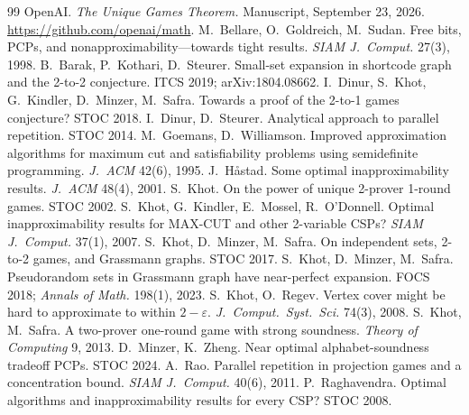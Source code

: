 \documentclass[11pt]{article}
\theoremstyle{definition}
\theoremstyle{remark}
\newcommand{\eps}{\varepsilon}
\begin{document}

\begin{thebibliography}{99}\small
{} OpenAI. \emph{The Unique Games Theorem.} Manuscript, September 23, 2026. \url{https://github.com/openai/math}.
 M.~Bellare, O.~Goldreich, M.~Sudan. Free bits, PCPs, and nonapproximability---towards tight results. \emph{SIAM J.\ Comput.} 27(3), 1998.
 B.~Barak, P.~Kothari, D.~Steurer. Small-set expansion in shortcode graph and the 2-to-2 conjecture. ITCS 2019; arXiv:1804.08662.
 I.~Dinur, S.~Khot, G.~Kindler, D.~Minzer, M.~Safra. Towards a proof of the 2-to-1 games conjecture? STOC 2018.
 I.~Dinur, D.~Steurer. Analytical approach to parallel repetition. STOC 2014.
 M.~Goemans, D.~Williamson. Improved approximation algorithms for maximum cut and satisfiability problems using semidefinite programming. \emph{J.\ ACM} 42(6), 1995.
 J.~H{\aa}stad. Some optimal inapproximability results. \emph{J.\ ACM} 48(4), 2001.
 S.~Khot. On the power of unique 2-prover 1-round games. STOC 2002.
 S.~Khot, G.~Kindler, E.~Mossel, R.~O'Donnell. Optimal inapproximability results for MAX-CUT and other 2-variable CSPs? \emph{SIAM J.\ Comput.} 37(1), 2007.
 S.~Khot, D.~Minzer, M.~Safra. On independent sets, 2-to-2 games, and Grassmann graphs. STOC 2017.
 S.~Khot, D.~Minzer, M.~Safra. Pseudorandom sets in Grassmann graph have near-perfect expansion. FOCS 2018; \emph{Annals of Math.} 198(1), 2023.
 S.~Khot, O.~Regev. Vertex cover might be hard to approximate to within $2-\eps$. \emph{J.\ Comput.\ Syst.\ Sci.} 74(3), 2008.
 S.~Khot, M.~Safra. A two-prover one-round game with strong soundness. \emph{Theory of Computing} 9, 2013.
 D.~Minzer, K.~Zheng. Near optimal alphabet-soundness tradeoff PCPs. STOC 2024.
 A.~Rao. Parallel repetition in projection games and a concentration bound. \emph{SIAM J.\ Comput.} 40(6), 2011.
 P.~Raghavendra. Optimal algorithms and inapproximability results for every CSP? STOC 2008.
\end{thebibliography}
\end{document}
